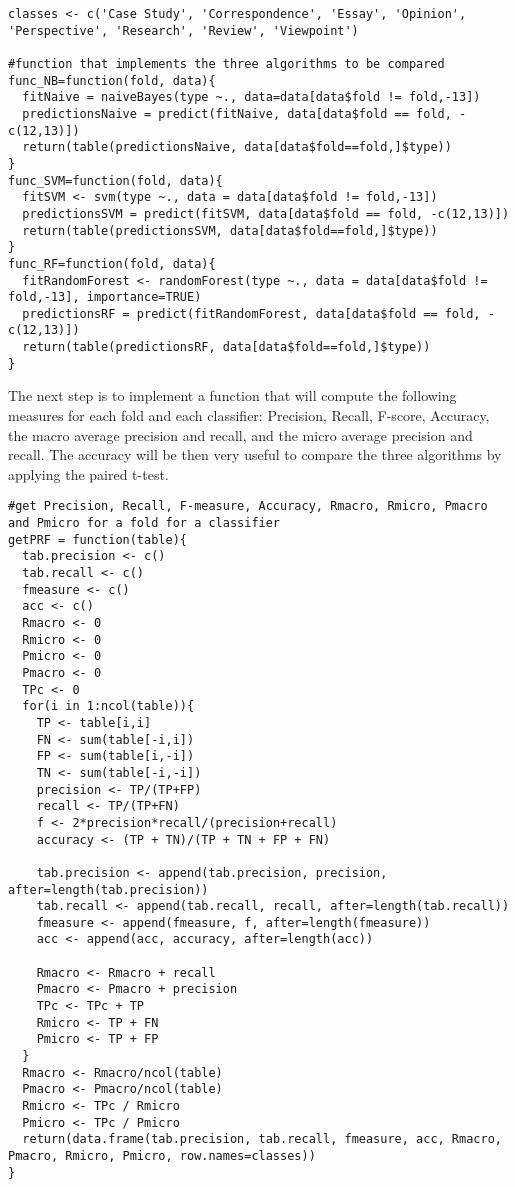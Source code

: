\documentclass[]{article}
\begin{document}
\begin{lstlisting}[frame=single]
classes <- c('Case Study', 'Correspondence', 'Essay', 'Opinion', 'Perspective', 'Research', 'Review', 'Viewpoint')

#function that implements the three algorithms to be compared
func_NB=function(fold, data){
  fitNaive = naiveBayes(type ~., data=data[data$fold != fold,-13])
  predictionsNaive = predict(fitNaive, data[data$fold == fold, -c(12,13)])
  return(table(predictionsNaive, data[data$fold==fold,]$type))
}
func_SVM=function(fold, data){
  fitSVM <- svm(type ~., data = data[data$fold != fold,-13])
  predictionsSVM = predict(fitSVM, data[data$fold == fold, -c(12,13)])
  return(table(predictionsSVM, data[data$fold==fold,]$type))
}
func_RF=function(fold, data){
  fitRandomForest <- randomForest(type ~., data = data[data$fold != fold,-13], importance=TRUE)
  predictionsRF = predict(fitRandomForest, data[data$fold == fold, -c(12,13)])
  return(table(predictionsRF, data[data$fold==fold,]$type))
}
\end{lstlisting}

The next step is to implement a function that will compute the following
measures for each fold and each classifier: Precision, Recall, F-score,
Accuracy, the macro average precision and recall, and the micro average
precision and recall. The accuracy will be then very useful to compare
the three algorithms by applying the paired t-test.

\begin{lstlisting}[frame=single]
#get Precision, Recall, F-measure, Accuracy, Rmacro, Rmicro, Pmacro and Pmicro for a fold for a classifier
getPRF = function(table){
  tab.precision <- c()
  tab.recall <- c()
  fmeasure <- c()
  acc <- c()
  Rmacro <- 0
  Rmicro <- 0
  Pmicro <- 0
  Pmacro <- 0
  TPc <- 0
  for(i in 1:ncol(table)){
    TP <- table[i,i]
    FN <- sum(table[-i,i])
    FP <- sum(table[i,-i])
    TN <- sum(table[-i,-i])
    precision <- TP/(TP+FP)
    recall <- TP/(TP+FN)
    f <- 2*precision*recall/(precision+recall)
    accuracy <- (TP + TN)/(TP + TN + FP + FN)

    tab.precision <- append(tab.precision, precision, after=length(tab.precision))
    tab.recall <- append(tab.recall, recall, after=length(tab.recall))
    fmeasure <- append(fmeasure, f, after=length(fmeasure))
    acc <- append(acc, accuracy, after=length(acc))

    Rmacro <- Rmacro + recall
    Pmacro <- Pmacro + precision
    TPc <- TPc + TP
    Rmicro <- TP + FN
    Pmicro <- TP + FP
  }
  Rmacro <- Rmacro/ncol(table)
  Pmacro <- Pmacro/ncol(table)
  Rmicro <- TPc / Rmicro
  Pmicro <- TPc / Pmicro
  return(data.frame(tab.precision, tab.recall, fmeasure, acc, Rmacro, Pmacro, Rmicro, Pmicro, row.names=classes))
}
\end{lstlisting}
\end{document}

